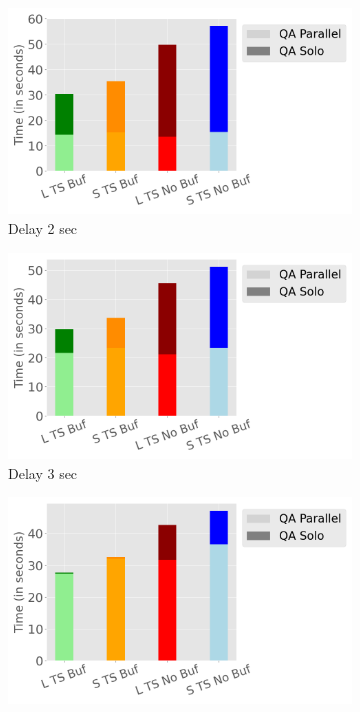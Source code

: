\begin{figure}
	\centering
	\begin{subfigure}[c]{0.45\textwidth}
		\includegraphics[width=1\textwidth]   {figures/Experiments/Dynamic/Breakdown/dataset_104857600_lockfree_Messi_Results_query_answering_breakdown_10485760_2.png}
		\caption{Delay 2 sec}
		\label{fig:query-answering-breakdown-2}
	\end{subfigure}
	\begin{subfigure}[c]{0.45\textwidth}
		\includegraphics[width=1\textwidth]   {figures/Experiments/Dynamic/Breakdown/dataset_104857600_lockfree_Messi_Results_query_answering_breakdown_10485760_3.png}
		\caption{Delay 3 sec}
		\label{fig:query-answering-breakdown-3}
	\end{subfigure}
	\begin{subfigure}[c]{0.45\textwidth}
		\includegraphics[width=1\textwidth]   {figures/Experiments/Dynamic/Breakdown/dataset_104857600_lockfree_Messi_Results_query_answering_breakdown_10485760_5.png}

\end{subfigure}
\end{figure}
